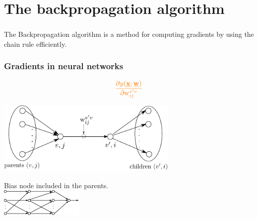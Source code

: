 \section{The backpropagation algorithm}

\begin{frame}\frametitle{\secname}

The Backpropagation algorithm is a method for computing gradients by using the chain rule efficiently.

\end{frame}


\begin{frame} \frametitle{Gradients in neural networks}
	\begin{equation*}
	\textcolor{orange}{	\frac{\partial y(\vec{x}; \vec{w})}{
			\partial \mathrm{w}_{ij}^{v'v}}}
	\end{equation*}

	\begin{center} \includegraphics[height=3.5cm]{img/section1_fig20.pdf} \end{center}

	\hspace{0.9cm} \tiny Bias node included in the parents.
	\vspace{0.3cm}\\
	\includegraphics[width=4cm]{img/MLP_horizontal.eps}
\end{frame}

